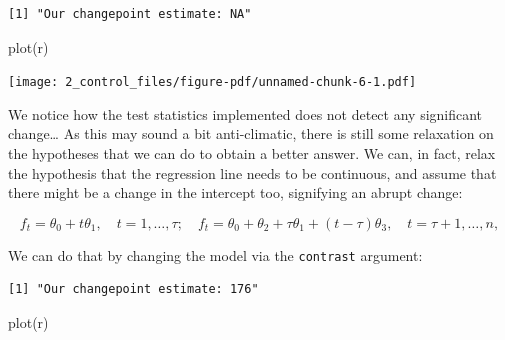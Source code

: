 \documentclass[
  letterpaper,
  DIV=11,
  numbers=noendperiod]{scrreprt}
\newenvironment{Shaded}{\begin{snugshade}}{\end{snugshade}}
\newcommand{\AttributeTok}[1]{\textcolor[rgb]{0.40,0.45,0.13}{#1}}
\newcommand{\ConstantTok}[1]{\textcolor[rgb]{0.56,0.35,0.01}{#1}}
\newcommand{\DecValTok}[1]{\textcolor[rgb]{0.68,0.00,0.00}{#1}}
\newcommand{\FunctionTok}[1]{\textcolor[rgb]{0.28,0.35,0.67}{#1}}
\newcommand{\NormalTok}[1]{\textcolor[rgb]{0.00,0.23,0.31}{#1}}
\newcommand{\OtherTok}[1]{\textcolor[rgb]{0.00,0.23,0.31}{#1}}
\newcommand{\SpecialCharTok}[1]{\textcolor[rgb]{0.37,0.37,0.37}{#1}}
\newcommand{\StringTok}[1]{\textcolor[rgb]{0.13,0.47,0.30}{#1}}
\begin{document}
\begin{verbatim}
[1] "Our changepoint estimate: NA"
\end{verbatim}

\begin{Shaded}
\begin{Highlighting}[]
\FunctionTok{plot}\NormalTok{(r)}
\end{Highlighting}
\end{Shaded}

\texttt{[image: 2\_control\_files/figure-pdf/unnamed-chunk-6-1.pdf]}

We notice how the test statistics implemented does not detect any
significant change\ldots{} As this may sound a bit anti-climatic, there
is still some relaxation on the hypotheses that we can do to obtain a
better answer. We can, in fact, relax the hypothesis that the regression
line needs to be continuous, and assume that there might be a change in
the intercept too, signifying an abrupt change:

\[
f_t = \theta_0 + t\theta_1, \quad t = 1, \dots, \tau; \quad f_t = \theta_0 + \theta_2 + \tau \theta_1 + (t-\tau)\theta_3, \quad t = \tau+1, \dots, n,
\]

We can do that by changing the model via the \texttt{contrast} argument:

\begin{Shaded}
\end{Shaded}

\begin{verbatim}
[1] "Our changepoint estimate: 176"
\end{verbatim}

\begin{Shaded}
\begin{Highlighting}[]
\FunctionTok{plot}\NormalTok{(r)}
\end{Highlighting}
\end{Shaded}
\end{document}
